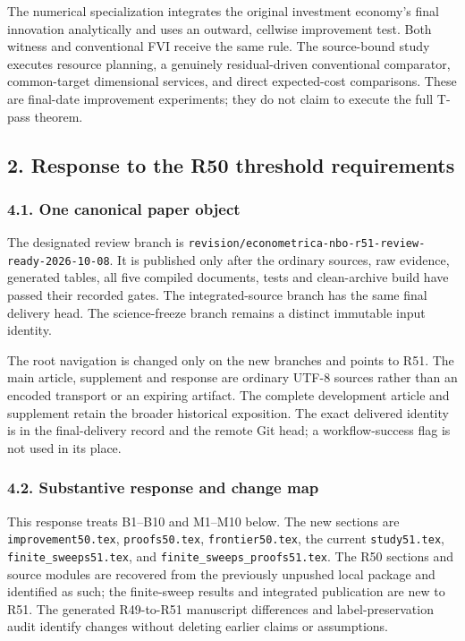 The numerical specialization integrates the original investment
economy's final innovation analytically and uses an outward, cellwise
improvement test. Both witness and conventional FVI receive the same
rule. The source-bound study executes resource planning, a genuinely
residual-driven conventional comparator, common-target dimensional
services, and direct expected-cost comparisons. These are final-date
improvement experiments; they do not claim to execute the full T-pass
theorem.

\hypertarget{response-to-the-r50-threshold-requirements}{%
\subsection{2. Response to the R50 threshold
requirements}\label{response-to-the-r50-threshold-requirements}}

\hypertarget{one-canonical-paper-object}{%
\subsubsection{4.1. One canonical paper
object}\label{one-canonical-paper-object}}

The designated review branch is
\texttt{revision/econometrica-nbo-r51-review-ready-2026-10-08}. It is
published only after the ordinary sources, raw evidence, generated
tables, all five compiled documents, tests and clean-archive build have
passed their recorded gates. The integrated-source branch has the same
final delivery head. The science-freeze branch remains a distinct
immutable input identity.

The root navigation is changed only on the new branches and points to
R51. The main article, supplement and response are ordinary UTF-8
sources rather than an encoded transport or an expiring artifact. The
complete development article and supplement retain the broader
historical exposition. The exact delivered identity is in the
final-delivery record and the remote Git head; a workflow-success flag
is not used in its place.

\hypertarget{substantive-response-and-change-map}{%
\subsubsection{4.2. Substantive response and change
map}\label{substantive-response-and-change-map}}

This response treats B1--B10 and M1--M10 below. The new sections are
\texttt{improvement50.tex}, \texttt{proofs50.tex},
\texttt{frontier50.tex}, the current \texttt{study51.tex},
\texttt{finite\_sweeps51.tex}, and
\texttt{finite\_sweeps\_proofs51.tex}. The R50 sections and source
modules are recovered from the previously unpushed local package and
identified as such; the finite-sweep results and integrated publication
are new to R51. The generated R49-to-R51 manuscript differences and
label-preservation audit identify changes without deleting earlier
claims or assumptions.

